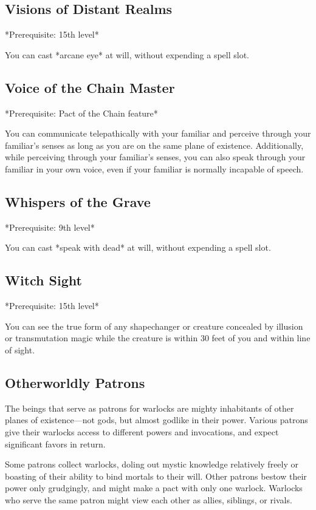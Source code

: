 \subsection{Visions of Distant Realms}

*Prerequisite: 15th level*

You can cast *arcane eye* at will, without expending a spell slot.

\subsection{Voice of the Chain Master}

*Prerequisite: Pact of the Chain feature*

You can communicate telepathically with your familiar and perceive through your familiar’s senses as long as you are on the same plane of existence. Additionally, while perceiving through your familiar’s senses, you can also speak through your familiar in your own voice, even if your familiar is normally incapable of speech.

\subsection{Whispers of the Grave}

*Prerequisite: 9th level*

You can cast *speak with dead* at will, without expending a spell slot.

\subsection{Witch Sight}

*Prerequisite: 15th level*

You can see the true form of any shapechanger or creature concealed by illusion or transmutation magic while the creature is within 30 feet of you and within line of sight.

\subsection{Otherworldly Patrons}

The beings that serve as patrons for warlocks are mighty inhabitants of other planes of existence—not gods, but almost godlike in their power. Various patrons give their warlocks access to different powers and invocations, and expect significant favors in return.

Some patrons collect warlocks, doling out mystic knowledge relatively freely or boasting of their ability to bind mortals to their will. Other patrons bestow their power only grudgingly, and might make a pact with only one warlock. Warlocks who serve the same patron might view each other as allies, siblings, or rivals.

